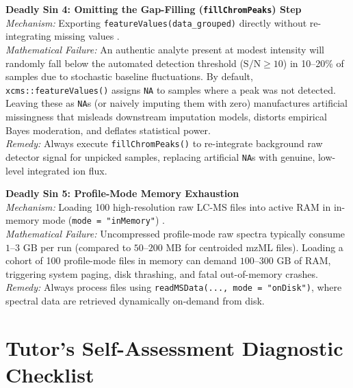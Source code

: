 \documentclass[11pt,twoside,openright]{book}
\begin{document}
\begin{pitfallbox}
\textbf{Deadly Sin 4: Omitting the Gap-Filling (\texttt{fillChromPeaks}) Step}\\
\textit{Mechanism:} Exporting \texttt{featureValues(data\_grouped)} directly without re-integrating missing values \cite{benton2015evaluating}.\\
\textit{Mathematical Failure:} An authentic analyte present at modest intensity will randomly fall below the automated detection threshold ($\text{S/N} \ge 10$) in 10--20\% of samples due to stochastic baseline fluctuations. By default, \texttt{xcms::featureValues()} assigns \texttt{NA} to samples where a peak was not detected. Leaving these as \texttt{NA}s (or naively imputing them with zero) manufactures artificial missingness that misleads downstream imputation models, distorts empirical Bayes moderation, and deflates statistical power.\\
\textit{Remedy:} Always execute \texttt{fillChromPeaks()} to re-integrate background raw detector signal for unpicked samples, replacing artificial \texttt{NA}s with genuine, low-level integrated ion flux.
\end{pitfallbox}

\begin{pitfallbox}
\textbf{Deadly Sin 5: Profile-Mode Memory Exhaustion}\\
\textit{Mechanism:} Loading 100 high-resolution raw LC-MS files into active RAM in in-memory mode (\texttt{mode = "inMemory"}) \cite{gatto2012msnbase}.\\
\textit{Mathematical Failure:} Uncompressed profile-mode raw spectra typically consume $1$--$3\text{ GB}$ per run (compared to $50$--$200\text{ MB}$ for centroided mzML files). Loading a cohort of 100 profile-mode files in memory can demand $100$--$300\text{ GB}$ of RAM, triggering system paging, disk thrashing, and fatal out-of-memory crashes.\\
\textit{Remedy:} Always process files using \texttt{readMSData(..., mode = "onDisk")}, where spectral data are retrieved dynamically on-demand from disk.
\end{pitfallbox}

\section{Tutor's Self-Assessment Diagnostic Checklist}
\end{document}
